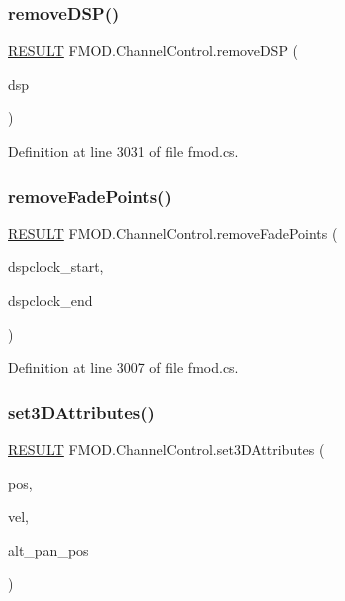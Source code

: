 \subsubsection{\texorpdfstring{remove\+D\+S\+P()}{removeDSP()}}
{\footnotesize\ttfamily \hyperlink{namespace_f_m_o_d_a305d1176ef3f8c8815861a60407ac33d}{R\+E\+S\+U\+LT} F\+M\+O\+D.\+Channel\+Control.\+remove\+D\+SP (\begin{DoxyParamCaption}\item[{\hyperlink{class_f_m_o_d_1_1_d_s_p}{D\+SP}}]{dsp }\end{DoxyParamCaption})}



Definition at line 3031 of file fmod.\+cs.

\mbox{\label{class_f_m_o_d_1_1_channel_control_a9ffa2be65b332b632094316c67a6c6c5}} 
\subsubsection{\texorpdfstring{remove\+Fade\+Points()}{removeFadePoints()}}
{\footnotesize\ttfamily \hyperlink{namespace_f_m_o_d_a305d1176ef3f8c8815861a60407ac33d}{R\+E\+S\+U\+LT} F\+M\+O\+D.\+Channel\+Control.\+remove\+Fade\+Points (\begin{DoxyParamCaption}\item[{ulong}]{dspclock\+\_\+start,  }\item[{ulong}]{dspclock\+\_\+end }\end{DoxyParamCaption})}



Definition at line 3007 of file fmod.\+cs.

\mbox{\label{class_f_m_o_d_1_1_channel_control_a1e7fa92958d154fe2e38afc04dc4872d}} 
\subsubsection{\texorpdfstring{set3\+D\+Attributes()}{set3DAttributes()}}
{\footnotesize\ttfamily \hyperlink{namespace_f_m_o_d_a305d1176ef3f8c8815861a60407ac33d}{R\+E\+S\+U\+LT} F\+M\+O\+D.\+Channel\+Control.\+set3\+D\+Attributes (\begin{DoxyParamCaption}\item[{ref \hyperlink{struct_f_m_o_d_1_1_v_e_c_t_o_r}{V\+E\+C\+T\+OR}}]{pos,  }\item[{ref \hyperlink{struct_f_m_o_d_1_1_v_e_c_t_o_r}{V\+E\+C\+T\+OR}}]{vel,  }\item[{ref \hyperlink{struct_f_m_o_d_1_1_v_e_c_t_o_r}{V\+E\+C\+T\+OR}}]{alt\+\_\+pan\+\_\+pos }\end{DoxyParamCaption})}



